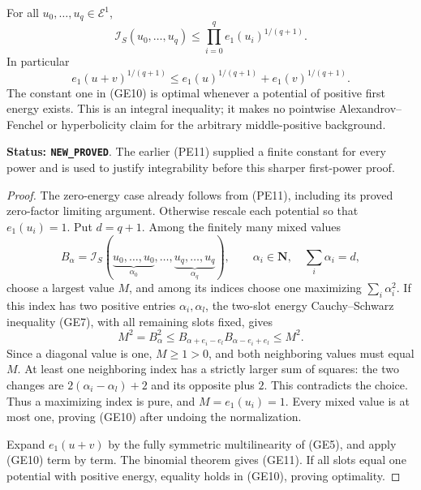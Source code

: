 \begin{theorem}
\label{thm:r11-optimal-first-energy-Holder}
For all $u_0,\ldots,u_q\in\mathcal E^1$,
\[
 \boxed{\quad
 \mathcal I_S(u_0,\ldots,u_q)
                    \leq\prod_{i=0}^q e_1(u_i)^{1/(q+1)}.
 \quad}
 \tag{GE10}
\]
In particular
\[
 e_1(u+v)^{1/(q+1)}
           \leq e_1(u)^{1/(q+1)}+e_1(v)^{1/(q+1)}.
 \tag{GE11}
\]
The constant one in (GE10) is optimal whenever a potential
of positive first energy exists. This is an integral inequality;
it makes no pointwise Alexandrov--Fenchel or hyperbolicity
claim for the arbitrary middle-positive background.
\end{theorem}

\noindent\textbf{Status: \texttt{NEW\_PROVED}}. The earlier
(PE11) supplied a finite constant for every power and is used
to justify integrability before this sharper first-power proof.

\begin{proof}
The zero-energy case already follows from (PE11), including
its proved zero-factor limiting argument. Otherwise rescale
each potential so that $e_1(u_i)=1$. Put $d=q+1$.
Among the finitely many mixed values
\[
 B_\alpha=\mathcal I_S(
             \underbrace{u_0,\ldots,u_0}_{\alpha_0},\ldots,
             \underbrace{u_q,\ldots,u_q}_{\alpha_q}),
       \qquad \alpha_i\in\mathbf N,\quad\sum_i\alpha_i=d,
\]
choose a largest value $M$, and among its indices choose one
maximizing $\sum_i\alpha_i^2$. If this index has two positive
entries $\alpha_i,\alpha_l$, the two-slot energy
Cauchy--Schwarz inequality (GE7), with all remaining slots
fixed, gives
\[
       M^2=B_\alpha^2
           \leq B_{\alpha+e_i-e_l}B_{\alpha-e_i+e_l}
           \leq M^2.
\]
Since a diagonal value is one, $M\geq1>0$, and both
neighboring values must equal $M$. At least one neighboring
index has a strictly larger sum of squares: the two changes
are $2(\alpha_i-\alpha_l)+2$ and its opposite plus $2$.
This contradicts the choice. Thus a maximizing index is
pure, and $M=e_1(u_i)=1$. Every mixed value is at most one,
proving (GE10) after undoing the normalization.

Expand $e_1(u+v)$ by the fully symmetric multilinearity of
(GE5), and apply (GE10) term by term. The binomial theorem
gives (GE11). If all slots equal one potential with positive
energy, equality holds in (GE10), proving optimality.
\end{proof}

